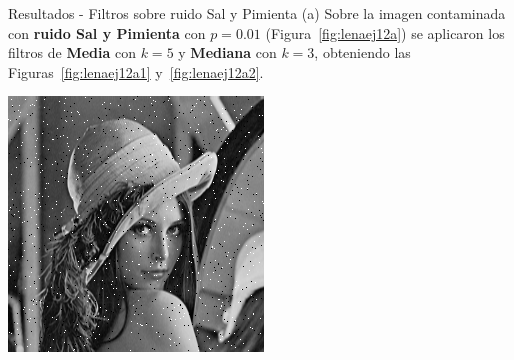 \documentclass{beamer}
\begin{document}
\begin{frame}[fragile]{Resultados - Filtros sobre ruido Sal y Pimienta (a)}
	\justifying
	Sobre la imagen contaminada con \textcolor{unahurverde}{\textbf{ruido Sal y Pimienta}} con $p=0.01$ (Figura~\ref{fig:lenaej12a})  
	se aplicaron los filtros de \textcolor{unahurverde}{\textbf{Media}} con $k=5$ y \textcolor{unahurverde}{\textbf{Mediana}} con $k=3$, obteniendo las Figuras~\ref{fig:lenaej12a1} y~\ref{fig:lenaej12a2}.
	
	\vspace{0.5cm}
	\centering
	\begin{minipage}{0.32\linewidth}
		\centering
		\includegraphics[width=\linewidth]{../results/lena_ej12a}
		\label{fig:lenaej12a}
	\end{minipage}\hfill
	\begin{minipage}{0.32\linewidth}
		\centering

\end{minipage}
\end{frame}
\end{document}
